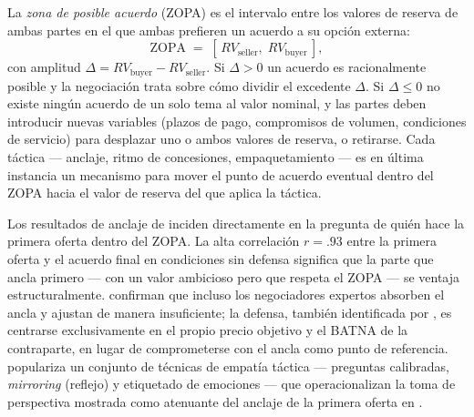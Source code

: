 La \emph{zona de posible acuerdo} (ZOPA) es el intervalo entre los valores de reserva de
ambas partes en el que ambas prefieren un acuerdo a su opción externa:
\begin{equation}\label{eq:zopa}
  \mathrm{ZOPA} \;=\; [\,RV_{\text{seller}},\; RV_{\text{buyer}}\,],
\end{equation}
con amplitud \(\Delta = RV_{\text{buyer}} - RV_{\text{seller}}\). Si \(\Delta > 0\) un acuerdo
es racionalmente posible y la negociación trata sobre cómo dividir el excedente \(\Delta\). Si
\(\Delta \leq 0\) no existe ningún acuerdo de un solo tema al valor nominal, y las partes deben
introducir nuevas variables (plazos de pago, compromisos de volumen, condiciones de servicio)
para desplazar uno o ambos valores de reserva, o retirarse. Cada táctica --- anclaje, ritmo de
concesiones, empaquetamiento --- es en última instancia un mecanismo para mover el punto de
acuerdo eventual dentro del ZOPA hacia el valor de reserva del que aplica la táctica.

Los resultados de anclaje de \textcite{galinsky2001anchoring} inciden directamente en la
pregunta de quién hace la primera oferta dentro del ZOPA. La alta correlación $r = .93$ entre
la primera oferta y el acuerdo final en condiciones sin defensa significa que la parte que
ancla primero --- con un valor ambicioso pero que respeta el ZOPA --- se ventaja
estructuralmente.
\textcite{northcraft1987anchoring} confirman que incluso los negociadores expertos absorben el
ancla y ajustan de manera insuficiente; la defensa, también identificada por
\textcite{galinsky2001anchoring}, es centrarse exclusivamente en el propio precio objetivo y
el BATNA de la contraparte, en lugar de comprometerse con el ancla como punto de referencia.
\textcite{voss2016never} populariza un conjunto de técnicas de empatía táctica --- preguntas calibradas, \emph{mirroring} (reflejo) y etiquetado de emociones --- que operacionalizan la toma de perspectiva mostrada como atenuante del anclaje de la primera oferta en \textcite{galinsky2001anchoring}.

